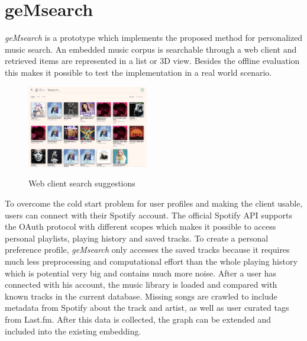 \documentclass[sigconf]{acmart}
\begin{document}
\section{geMsearch}
\emph{geMsearch} is a prototype which implements the proposed method for personalized music search. An embedded music corpus is searchable through a web client and retrieved items are represented in a list or 3D view. Besides the offline evaluation this makes it possible to test the implementation in a real world scenario. 



\begin{figure}[ht]
	{\includegraphics[width=200px]{web_client.png}}	
	\caption{Web client search suggestions}
	\label{fig:web_client}
\end{figure}


\label{sec:impl_spotify_connect}
To overcome the cold start problem for user profiles and making the client usable, users can connect with their Spotify account. The official Spotify API supports the OAuth protocol with different scopes which makes it possible to access personal playlists, playing history and saved tracks. To create a personal preference profile, \emph{geMsearch} only accesses the saved tracks because it requires much less preprocessing and computational effort than the whole playing history which is potential very big and contains much more noise. After a user has connected with his account, the music library is loaded and compared with known tracks in the current database. Missing songs are crawled to include metadata from Spotify about the track and artist, as well as user curated tags from Last.fm. After this data is collected, the graph can be extended and included into the existing embedding.
\end{document}
